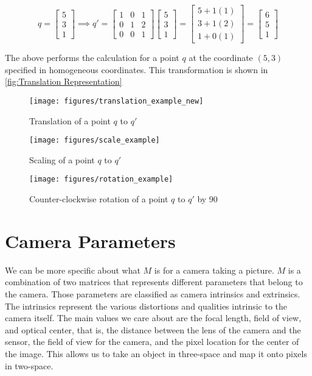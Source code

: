 \documentclass[
    12pt,
    twoside,
    bibstyle=chicago,
    headerstyle=uppercase,
	bibfile=biblatex_updating.bib
]{reedthesis}
\begin{document}
\[q = \begin{bmatrix}5\\3\\1\end{bmatrix} \implies q' = \begin{bmatrix}1&0&1\\0&1&2\\0&0&1\end{bmatrix}\begin{bmatrix}5\\3\\1\end{bmatrix} = \begin{bmatrix}5 + 1(1)\\3 + 1(2)\\1 + 0(1)\end{bmatrix}= \begin{bmatrix}6\\5\\1\end{bmatrix}\]

The above performs the calculation for a point $q$ at the coordinate $(5,3)$ specified in homogeneous coordinates. This transformation is shown in \ref{fig:Translation Representation}

\begin{figure}[p]
	   
        \centering
        \texttt{[image: figures/translation\_example\_new]}
        \caption{Translation of a point $q$ to $q'$}    \label{fig:Translation Representation}
        \bigskip%
        \texttt{[image: figures/scale\_example]}
        \caption{Scaling of a point $q$ to $q'$}    \label{fig:Scale Representation}
        \bigskip
        \texttt{[image: figures/rotation\_example]}
        \caption{Counter-clockwise rotation of a point $q$ to $q'$ by 90\degree}    \label{fig:Rotation Representation}

\end{figure}
	

\section{Camera Parameters}

We can be more specific about what $M$ is for a camera taking a picture. $M$ is a combination of two matrices that represents different parameters that belong to the camera. Those parameters are classified as camera intrinsics and extrinsics. The intrinsics represent the various distortions and qualities intrinsic to the camera itself. The main values we care about are the focal length, field of view, and optical center, that is, the distance between the lens of the camera and the sensor, the field of view for the camera, and the pixel location for the center of the image. This allows us to take an object in three-space and map it onto pixels in two-space. 
\end{document}
